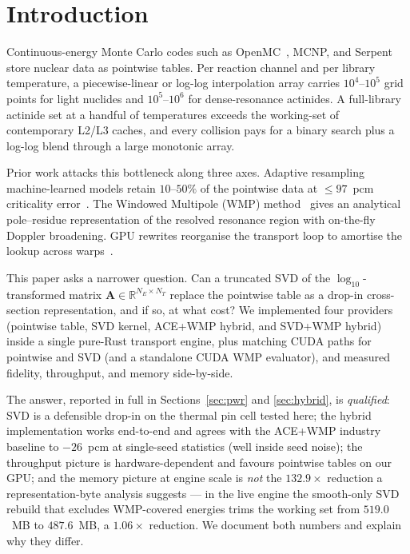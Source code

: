 \section{Introduction}
\label{sec:intro}

Continuous-energy Monte Carlo codes such as
OpenMC~\cite{romano2015openmc}, MCNP, and Serpent store
nuclear data as pointwise tables. Per reaction channel and
per library temperature, a piecewise-linear or log-log
interpolation array carries $10^4$--$10^5$ grid points for
light nuclides and $10^5$--$10^6$ for dense-resonance
actinides. A full-library actinide set at a handful of
temperatures exceeds the working-set of contemporary L2/L3
caches, and every collision pays for a binary search plus a
log-log blend through a large monotonic array.

Prior work attacks this bottleneck along three axes. Adaptive
resampling machine-learned models retain $10$--$50\%$ of the
pointwise data at $\leq 97$~pcm criticality
error~\cite{ml_resampling_2025,ml_fullcore_2026}. The
Windowed Multipole (WMP)
method~\cite{josey2015wmp,forget2014wmp,hybrid_wn_2021} gives
an analytical pole--residue representation of the resolved
resonance region with on-the-fly Doppler broadening. GPU
rewrites reorganise the transport loop to amortise the lookup
across warps~\cite{tramm2024,tramm2014xsbench}.

This paper asks a narrower question. Can a truncated SVD of
the $\log_{10}$-transformed matrix $\mathbf{A} \in
\mathbb{R}^{N_E \times N_T}$ replace the pointwise table as a
drop-in cross-section representation, and if so, at what
cost? We implemented four providers (pointwise table, SVD
kernel, ACE+WMP hybrid, and SVD+WMP hybrid) inside a single
pure-Rust transport engine, plus matching CUDA paths for
pointwise and SVD (and a standalone CUDA WMP evaluator), and
measured fidelity, throughput, and memory side-by-side.

The answer, reported in full in Sections~\ref{sec:pwr} and
\ref{sec:hybrid}, is \emph{qualified}: SVD is a defensible
drop-in on the thermal pin cell tested here; the hybrid
implementation works end-to-end and agrees with the
ACE+WMP industry baseline to $-26$~pcm at single-seed
statistics (well inside seed noise); the throughput picture
is hardware-dependent and favours pointwise tables on our
GPU; and the memory picture at engine scale is \emph{not}
the $132.9\times$ reduction a representation-byte analysis
suggests --- in the live engine the smooth-only SVD rebuild
that excludes WMP-covered energies trims the working set
from $519.0$~MB to $487.6$~MB, a $1.06\times$ reduction. We
document both numbers and explain why they differ.

